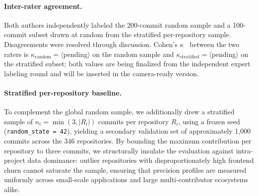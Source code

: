\documentclass{article}
\begin{document}
\paragraph{Inter-rater agreement.}
Both authors independently labeled the 200-commit random sample and a
100-commit subset drawn at random from the stratified per-repository
sample. Disagreements were resolved through discussion. Cohen's
$\kappa$~\cite{cohen1960} between the two raters is
$\kappa_{\text{random}} = \langle$pending$\rangle$ on the random sample and
$\kappa_{\text{stratified}} = \langle$pending$\rangle$ on the stratified
subset; both values are being finalized from the independent expert
labeling round and will be inserted in the camera-ready version.

\paragraph{Stratified per-repository baseline.}
To complement the global random sample, we additionally drew a stratified
sample of $n_i = \min(3, |R_i|)$ commits per repository $R_i$, using a
frozen seed (\texttt{random\_state = 42}), yielding a secondary validation
set of approximately 1,000 commits across the 346 repositories. By
bounding the maximum contribution per repository to three commits, we
structurally insulate the evaluation against intra-project data
dominance: outlier repositories with disproportionately high frontend
churn cannot saturate the sample, ensuring that precision profiles are
measured uniformly across small-scale applications and large
multi-contributor ecosystems alike.
\end{document}
